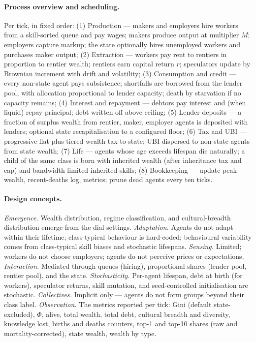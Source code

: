 \documentclass[11pt]{article}
\begin{document}
\paragraph{Process overview and scheduling.} Per tick, in fixed
order: (1) Production --- makers and employers hire workers from a
skill-sorted queue and pay wages; makers produce output at multiplier
$M$; employers capture markup; the state optionally hires
unemployed workers and purchases maker output;
(2) Extraction --- workers pay rent to rentiers in proportion to
rentier wealth; rentiers earn capital return $r$; speculators
update by Brownian increment with drift and volatility;
(3) Consumption and credit --- every non-state agent pays
subsistence; shortfalls are borrowed from the lender pool, with
allocation proportional to lender capacity; death by starvation
if no capacity remains;
(4) Interest and repayment --- debtors pay interest and (when
liquid) repay principal; debt written off above ceiling;
(5) Lender deposits --- a fraction of surplus wealth from rentier,
maker, employer agents is deposited with lenders; optional state
recapitalisation to a configured floor;
(6) Tax and UBI --- progressive flat-plus-tiered wealth tax to
state; UBI dispersed to non-state agents from state wealth;
(7) Life --- agents whose age exceeds lifespan die naturally; a
child of the same class is born with inherited wealth (after
inheritance tax and cap) and bandwidth-limited inherited skills;
(8) Bookkeeping --- update peak-wealth, recent-deaths log,
metrics; prune dead agents every ten ticks.

\paragraph{Design concepts.}
\emph{Emergence.} Wealth distribution, regime classification, and
cultural-breadth distribution emerge from the dial settings.
\emph{Adaptation.} Agents do not adapt within their lifetime;
class-typical behaviour is hard-coded; behavioural variability
comes from class-typical skill biases and stochastic lifespans.
\emph{Sensing.} Limited; workers do not choose employers; agents
do not perceive prices or expectations.
\emph{Interaction.} Mediated through queues (hiring),
proportional shares (lender pool, rentier pool), and the state.
\emph{Stochasticity.} Per-agent lifespan, debt at birth (for
workers), speculator returns, skill mutation, and seed-controlled
initialisation are stochastic.
\emph{Collectives.} Implicit only --- agents do not form groups
beyond their class label.
\emph{Observation.} The metrics reported per tick: Gini (default
state-excluded), $\Phi$, alive, total wealth, total debt,
cultural breadth and diversity, knowledge lost, births and deaths
counters, top-1 and top-10 shares (raw and mortality-corrected),
state wealth, wealth by type.
\end{document}
